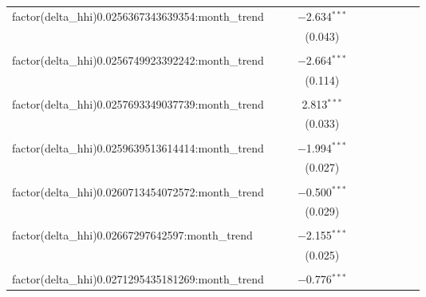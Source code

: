 \begin{table}[H]
{\begin{tabular}{@{\extracolsep{5pt}}lccccccccc}
  factor(delta\_hhi)0.0256367343639354:month\_trend &  &  & $-$2.634$^{***}$ &  &  &  &  &  &  \\  

   &  &  & (0.043) &  &  &  &  &  &  \\  

   & & & & & & & & & \\  

  factor(delta\_hhi)0.0256749923392242:month\_trend &  &  & $-$2.664$^{***}$ &  &  &  &  &  &  \\  

   &  &  & (0.114) &  &  &  &  &  &  \\  

   & & & & & & & & & \\  

  factor(delta\_hhi)0.0257693349037739:month\_trend &  &  & 2.813$^{***}$ &  &  &  &  &  &  \\  

   &  &  & (0.033) &  &  &  &  &  &  \\  

   & & & & & & & & & \\  

  factor(delta\_hhi)0.0259639513614414:month\_trend &  &  & $-$1.994$^{***}$ &  &  &  &  &  &  \\  

   &  &  & (0.027) &  &  &  &  &  &  \\  

   & & & & & & & & & \\  

  factor(delta\_hhi)0.0260713454072572:month\_trend &  &  & $-$0.500$^{***}$ &  &  &  &  &  &  \\  

   &  &  & (0.029) &  &  &  &  &  &  \\  

   & & & & & & & & & \\  

  factor(delta\_hhi)0.02667297642597:month\_trend &  &  & $-$2.155$^{***}$ &  &  &  &  &  &  \\  

   &  &  & (0.025) &  &  &  &  &  &  \\  

   & & & & & & & & & \\  

  factor(delta\_hhi)0.0271295435181269:month\_trend &  &  & $-$0.776$^{***}$ &  &  &  &  &  &  \\  


\end{tabular}}
\end{table}
